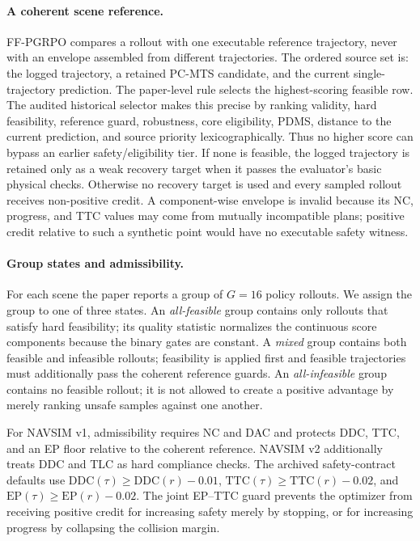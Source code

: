 \paragraph{A coherent scene reference.}
FF-PGRPO compares a rollout with one executable reference trajectory, never
with an envelope assembled from different trajectories.  The ordered source
set is: the logged trajectory, a retained PC-MTS candidate, and the current
single-trajectory prediction.  The paper-level rule selects the highest-scoring
feasible row.  The audited historical selector makes this precise by ranking
validity, hard feasibility, reference guard, robustness, core eligibility,
PDMS, distance to the current prediction, and source priority lexicographically.
Thus no higher score can bypass an earlier safety/eligibility tier.  If none is feasible, the
logged trajectory is retained only as a weak recovery target when it passes
the evaluator's basic physical checks.  Otherwise no recovery target is used
and every sampled rollout receives non-positive credit.  A component-wise
envelope is invalid because its NC, progress, and TTC values may come from
mutually incompatible plans; positive credit relative to such a synthetic
point would have no executable safety witness.

\paragraph{Group states and admissibility.}
For each scene the paper reports a group of $G=16$ policy rollouts.  We assign
the group to one of three states.  An \emph{all-feasible} group contains only
rollouts that satisfy hard feasibility; its quality statistic normalizes the
continuous score components because the binary gates are constant.  A
\emph{mixed} group contains both feasible and infeasible rollouts; feasibility
is applied first and feasible trajectories must additionally pass the coherent
reference guards.  An \emph{all-infeasible} group contains no feasible
rollout; it is not allowed to create a positive advantage by merely ranking
unsafe samples against one another.

For NAVSIM v1, admissibility requires NC and DAC and protects DDC, TTC, and an
EP floor relative to the coherent reference.  NAVSIM v2 additionally treats
DDC and TLC as hard compliance checks.  The archived safety-contract defaults
use $\mathrm{DDC}(\tau)\geq\mathrm{DDC}(r)-0.01$,
$\mathrm{TTC}(\tau)\geq\mathrm{TTC}(r)-0.02$, and
$\mathrm{EP}(\tau)\geq\mathrm{EP}(r)-0.02$.  The joint EP--TTC guard prevents
the optimizer from receiving positive credit for increasing safety merely by
stopping, or for increasing progress by collapsing the collision margin.

